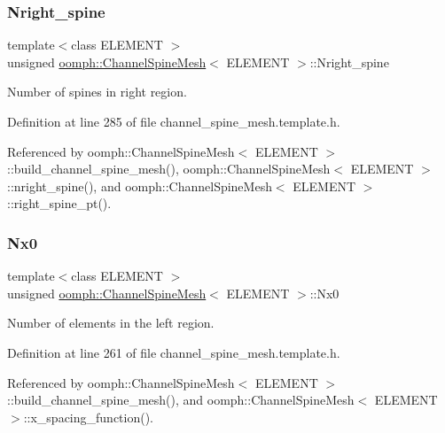 \subsubsection{\texorpdfstring{Nright\+\_\+spine}{Nright\_spine}}
{\footnotesize\ttfamily template$<$class E\+L\+E\+M\+E\+NT $>$ \\
unsigned \hyperlink{classoomph_1_1ChannelSpineMesh}{oomph\+::\+Channel\+Spine\+Mesh}$<$ E\+L\+E\+M\+E\+NT $>$\+::Nright\+\_\+spine\hspace{0.3cm}{\ttfamily [protected]}}



Number of spines in right region. 



Definition at line 285 of file channel\+\_\+spine\+\_\+mesh.\+template.\+h.



Referenced by oomph\+::\+Channel\+Spine\+Mesh$<$ E\+L\+E\+M\+E\+N\+T $>$\+::build\+\_\+channel\+\_\+spine\+\_\+mesh(), oomph\+::\+Channel\+Spine\+Mesh$<$ E\+L\+E\+M\+E\+N\+T $>$\+::nright\+\_\+spine(), and oomph\+::\+Channel\+Spine\+Mesh$<$ E\+L\+E\+M\+E\+N\+T $>$\+::right\+\_\+spine\+\_\+pt().

\mbox{\label{classoomph_1_1ChannelSpineMesh_a283ffaeb501cec43df629d3bf06fe3d2}} 
\subsubsection{\texorpdfstring{Nx0}{Nx0}}
{\footnotesize\ttfamily template$<$class E\+L\+E\+M\+E\+NT $>$ \\
unsigned \hyperlink{classoomph_1_1ChannelSpineMesh}{oomph\+::\+Channel\+Spine\+Mesh}$<$ E\+L\+E\+M\+E\+NT $>$\+::Nx0\hspace{0.3cm}{\ttfamily [protected]}}



Number of elements in the left region. 



Definition at line 261 of file channel\+\_\+spine\+\_\+mesh.\+template.\+h.



Referenced by oomph\+::\+Channel\+Spine\+Mesh$<$ E\+L\+E\+M\+E\+N\+T $>$\+::build\+\_\+channel\+\_\+spine\+\_\+mesh(), and oomph\+::\+Channel\+Spine\+Mesh$<$ E\+L\+E\+M\+E\+N\+T $>$\+::x\+\_\+spacing\+\_\+function().

